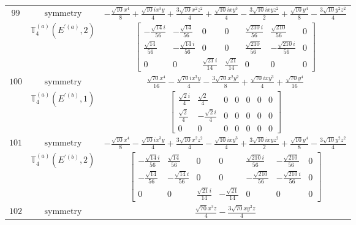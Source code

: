 \documentclass[fleqn,8pt,landscape]{jsarticle}
\begin{document}
\begin{longtable}{ccc}
$ 99 $ & $ \text{symmetry} $ & $ - \frac{\sqrt{10} x^{4}}{8} + \frac{\sqrt{10} i x^{3} y}{4} + \frac{3 \sqrt{10} x^{2} z^{2}}{4} + \frac{\sqrt{10} i x y^{3}}{4} - \frac{3 \sqrt{10} i x y z^{2}}{2} + \frac{\sqrt{10} y^{4}}{8} - \frac{3 \sqrt{10} y^{2} z^{2}}{4} $ \\
$  $ & $ \mathbb{T}_{4}^{(a)}(E^{\prime(a)},2) $ & $ \begin{bmatrix} - \frac{\sqrt{14} i}{56} & - \frac{\sqrt{14}}{56} & 0 & 0 & \frac{\sqrt{210} i}{56} & \frac{\sqrt{210}}{56} & 0 \\ \frac{\sqrt{14}}{56} & - \frac{\sqrt{14} i}{56} & 0 & 0 & \frac{\sqrt{210}}{56} & - \frac{\sqrt{210} i}{56} & 0 \\ 0 & 0 & \frac{\sqrt{21} i}{14} & \frac{\sqrt{21}}{14} & 0 & 0 & 0 \end{bmatrix} $ \\ \hline
$ 100 $ & $ \text{symmetry} $ & $ \frac{\sqrt{70} x^{4}}{16} - \frac{\sqrt{70} i x^{3} y}{4} - \frac{3 \sqrt{70} x^{2} y^{2}}{8} + \frac{\sqrt{70} i x y^{3}}{4} + \frac{\sqrt{70} y^{4}}{16} $ \\
$  $ & $ \mathbb{T}_{4}^{(a)}(E^{\prime(b)},1) $ & $ \begin{bmatrix} \frac{\sqrt{2} i}{4} & \frac{\sqrt{2}}{4} & 0 & 0 & 0 & 0 & 0 \\ \frac{\sqrt{2}}{4} & - \frac{\sqrt{2} i}{4} & 0 & 0 & 0 & 0 & 0 \\ 0 & 0 & 0 & 0 & 0 & 0 & 0 \end{bmatrix} $ \\ \hline
$ 101 $ & $ \text{symmetry} $ & $ - \frac{\sqrt{10} x^{4}}{8} - \frac{\sqrt{10} i x^{3} y}{4} + \frac{3 \sqrt{10} x^{2} z^{2}}{4} - \frac{\sqrt{10} i x y^{3}}{4} + \frac{3 \sqrt{10} i x y z^{2}}{2} + \frac{\sqrt{10} y^{4}}{8} - \frac{3 \sqrt{10} y^{2} z^{2}}{4} $ \\
$  $ & $ \mathbb{T}_{4}^{(a)}(E^{\prime(b)},2) $ & $ \begin{bmatrix} - \frac{\sqrt{14} i}{56} & \frac{\sqrt{14}}{56} & 0 & 0 & \frac{\sqrt{210} i}{56} & - \frac{\sqrt{210}}{56} & 0 \\ - \frac{\sqrt{14}}{56} & - \frac{\sqrt{14} i}{56} & 0 & 0 & - \frac{\sqrt{210}}{56} & - \frac{\sqrt{210} i}{56} & 0 \\ 0 & 0 & \frac{\sqrt{21} i}{14} & - \frac{\sqrt{21}}{14} & 0 & 0 & 0 \end{bmatrix} $ \\ \hline
$ 102 $ & $ \text{symmetry} $ & $ \frac{\sqrt{70} x^{3} z}{4} - \frac{3 \sqrt{70} x y^{2} z}{4} $ \\

\end{longtable}
\end{document}
